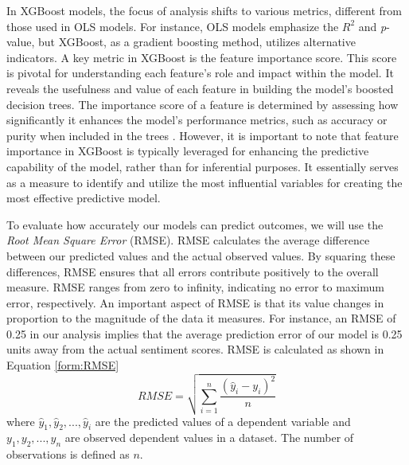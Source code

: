 In XGBoost models, the focus of analysis shifts to various metrics, different from those used in OLS models. For instance, OLS models emphasize the \(R^2\) and \textit{p}-value, but XGBoost, as a gradient boosting method, utilizes alternative indicators. A key metric in XGBoost is the feature importance score. This score is pivotal for understanding each feature's role and impact within the model. It reveals the usefulness and value of each feature in building the model's boosted decision trees. The importance score of a feature is determined by assessing how significantly it enhances the model's performance metrics, such as accuracy or purity when included in the trees \parencite{Chen:2016:XST:2939672.2939785}. However, it is important to note that feature importance in XGBoost is typically leveraged for enhancing the predictive capability of the model, rather than for inferential purposes. It essentially serves as a measure to identify and utilize the most influential variables for creating the most effective predictive model.

To evaluate how accurately our models can predict outcomes, we will use %
the \textit{Root Mean Square Error} (RMSE). RMSE calculates the average difference between our predicted values and the actual observed values. By squaring these differences, RMSE ensures that all errors contribute positively to the overall measure. RMSE ranges from zero to infinity, indicating no error to maximum error, respectively. An important aspect of RMSE is that its value changes in proportion to the magnitude of the data it measures. For instance, an RMSE of 0.25 in our analysis implies that the average prediction error of our model is 0.25 units away from the actual sentiment scores. %
RMSE is calculated as shown in Equation \ref{form:RMSE}
\vspace{-3pt}
\begin{equation}
    RMSE = \sqrt{\sum_{i=1}^{n} \frac{(\hat{y}_i - y_i)^2}{n} }
    \label{form:RMSE}
\end{equation}
\vspace{-1pt}
where \(\hat{y}_1, \hat{y}_2, ..., \hat{y}_i\) are the predicted values of a dependent variable %
and \(y_1, y_2, ... , y_n\) are observed dependent values in a dataset. The number of observations is defined as \(n\).



